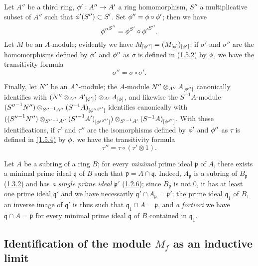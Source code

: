 \begin{env}[1.5.7]
\label{0.1.5.7}
Let $A''$ be a third ring, $\phi':A''\to A'$ a ring homomorphism, $S''$ a
multiplicative subset of $A''$ such that $\phi'(S'')\subset S'$. Set
$\phi''=\phi\circ\phi'$; then we have
\[
  {\phi''}^{S''}=\phi^{S'}\circ{\phi'}^{S''}.
\]
Let $M$ be an $A$-module; evidently we have
$M_{[\phi'']}=(M_{[\phi]})_{[\phi']}$; if $\sigma'$ and $\sigma''$ are the
homomorphisms defined by $\phi'$ and $\phi''$ as $\sigma$ is defined in
\hyperref[0.1.5.2]{(1.5.2)} by $\phi$, we have the transitivity formula
\[
  \sigma''=\sigma\circ\sigma'.
\]

Finally, let $N''$ be an $A''$-module; the $A$-module
$N''\otimes_{A''}A_{[\phi'']}$ canonically identifies with
$(N''\otimes_{A''}{A'}_{[\phi']})\otimes_{A'}A_{[\phi]}$, and likewise the
$S^{-1}A$-module
$({S''}^{-1}N'')\otimes_{{S''}^{-1}A''}(S^{-1}A)_{[{\phi''}^{S''}]}$ identifies
canonically with
$(({S''}^{-1}N'')\otimes_{{S''}^{-1}A''}({S'}^{-1}A')_{[{\phi'}^{S''}]})
  \otimes_{{S'}^{-1}A'}(S^{-1}A)_{[\phi^{S'}]}$. With these identifications, if
$\tau'$ and $\tau''$ are the isomorphisms defined by $\phi'$ and $\phi''$ as
$\tau$ is defined in \hyperref[0.1.5.4]{(1.5.4)} by $\phi$, we have the transitivity
formula
\[
  \tau''=\tau\circ(\tau'\otimes 1).
\]
\end{env}

\begin{env}[1.5.8]
\label{0.1.5.8}
Let $A$ be a subring of a ring $B$; for every {\em minimal} prime ideal
$\mathfrak{p}$ of $A$, there exists a minimal prime ideal $\mathfrak{q}$ of $B$
such that $\mathfrak{p}=A\cap\mathfrak{q}$. Indeed, $A_\mathfrak{p}$ is a
subring of $B_\mathfrak{p}$ \hyperref[0.1.3.2]{(1.3.2)} and has {\em a single prime
ideal $\mathfrak{p}'$} \hyperref[0.1.2.6]{(1.2.6)}; since $B_\mathfrak{p}$ is not
$0$, it has at least one prime ideal $\mathfrak{q}'$ and we have necessarily
$\mathfrak{q}'\cap A_\mathfrak{p}=\mathfrak{p}'$; the prime ideal
$\mathfrak{q}_1$ of $B$, an inverse image of $\mathfrak{q}'$ is thus such that
$\mathfrak{q}_1\cap A=\mathfrak{p}$, and {\em a fortiori} we have
$\mathfrak{q}\cap A=\mathfrak{p}$ for every minimal prime ideal $\mathfrak{q}$
of $B$ contained in $\mathfrak{q}_1$.
\end{env}

\subsection{Identification of the module $M_f$ as an inductive limit}
\label{subsection-localization-as-inductive-limit}

